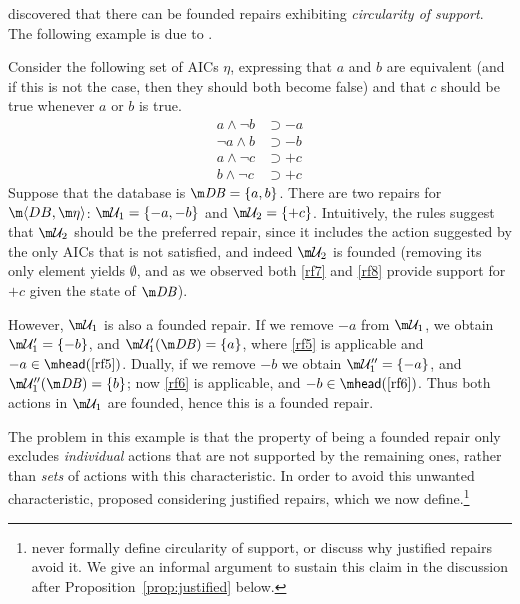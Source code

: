 \citet{tplp/CaropreseT11} discovered that there can be founded repairs exhibiting \emph{circularity of support}.
The following example is due to \citet{tase/Cruz-FilipeGEN13}.

\begin{example}
  \label{ex:founded}
  Consider the following set of AICs $\eta$, expressing that $a$ and $b$ are equivalent (and if this is not the case, then they should both become false) and that $c$ should be true whenever $a$ or $b$ is true.
  \begin{align}
    a\land\neg b &\supset{-a} \label{rf5} \\
    \neg a\land b &\supset{-b} \label{rf6} \\
    a\land\neg c &\supset{+c} \label{rf7} \\
    b\land\neg c &\supset{+c} \label{rf8} 
  \end{align}
  Suppose that the database is $\db=\{a,b\}$.
  There are two repairs for $\fulldb$: $\UU_1=\{{-a},{-b}\}$ and $\UU_2=\{{+c}\}$.
  Intuitively, the rules suggest that $\UU_2$ should be the preferred repair, since it includes the action suggested by the only AICs that is not satisfied, and indeed $\UU_2$ is founded (removing its only element yields $\emptyset$, and as we observed both \ref{rf7} and \ref{rf8} provide support for ${+c}$ given the state of $\db$).

  However, $\UU_1$ is also a founded repair.
  If we remove ${-a}$ from $\UU_1$, we obtain $\UU_1'=\{{-b}\}$, and $\UU_1'(\db)=\{a\}$, where \ref{rf5} is applicable and ${-a}\in\head(\ref{rf5})$.
  Dually, if we remove ${-b}$ we obtain $\UU_1''=\{{-a}\}$, and $\UU_1''(\db)=\{b\}$; now \ref{rf6} is applicable, and ${-b}\in\head(\ref{rf6})$.
  Thus both actions in $\UU_1$ are founded, hence this is a founded repair.
\end{example}

The problem in this example is that the property of being a founded repair only excludes \emph{individual} actions that are not supported by the remaining ones, rather than \emph{sets} of actions with this characteristic.
In order to avoid this unwanted characteristic, \citet{tplp/CaropreseT11} proposed considering justified repairs, which we now define.\footnote{\citet{tplp/CaropreseT11} never formally define circularity of support, or discuss why justified repairs avoid it. We give an informal argument to sustain this claim in the discussion after Proposition~\ref{prop:justified} below.}


